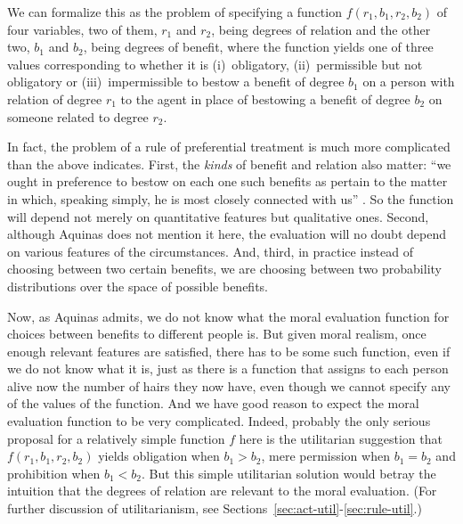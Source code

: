 We can formalize this as the problem of specifying a function $f(r_1,b_1,r_2,b_2)$ of four variables, two of them, $r_1$ and $r_2$, being
degrees of relation and the other two, $b_1$ and $b_2$, being degrees of benefit, where the function yields one of three values
corresponding to whether it is (i)~obligatory, (ii)~permissible but not obligatory or (iii)~impermissible to bestow a benefit of degree $b_1$ on a person with
relation of degree $r_1$ to the agent in place of bestowing a benefit of degree $b_2$ on someone related to degree $r_2$. 

In fact, the problem of a rule of preferential treatment is much more complicated than the above indicates. First, the \textit{kinds} of benefit and relation also matter: ``we ought in preference 
to bestow on each one such benefits as pertain to the matter in which, speaking simply, he is most closely connected with us'' \parencite[II-II Q31 A3]{AquinasST}.
So the function will depend not merely on quantitative features but qualitative ones. Second, although Aquinas does not mention it here,
the evaluation will no doubt depend on various features of the circumstances. And, third, in practice instead of choosing between
two certain benefits, we are choosing between two probability distributions over the space of possible benefits.

Now, as Aquinas admits, we do not know what the moral evaluation function for choices between benefits to different people is.
But given moral realism, once enough relevant features are satisfied, there has to be some such function, even if we do not know what it is, just as there is a function that assigns to each person
alive now the number of hairs they now have, even though we cannot specify any of the values of the function.
And we have good reason to expect the moral evaluation function to be very complicated. Indeed, probably the only serious proposal for a
relatively simple function $f$ here is the utilitarian suggestion that $f(r_1,b_1,r_2,b_2)$ yields obligation when $b_1>b_2$,
mere permission when $b_1=b_2$ and prohibition when $b_1<b_2$. But this simple utilitarian solution would betray the intuition that
the degrees of relation are relevant to the moral evaluation. (For further discussion of utilitarianism, see Sections~\ref{sec:act-util}-\ref{sec:rule-util}.)

